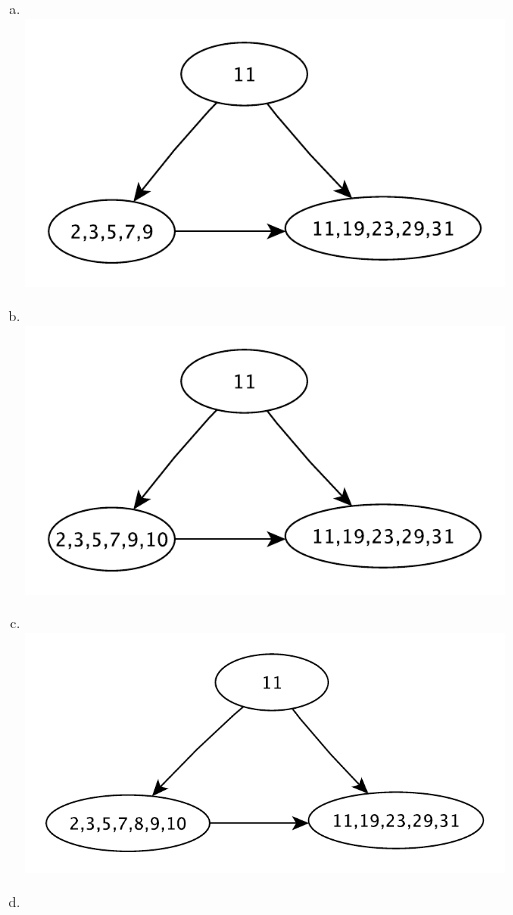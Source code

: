 \documentclass[a4paper,11pt]{article}
\begin{document}
\begin{enumerate}[a.]
    \item ~\\
        \includegraphics[scale=0.7]{2-3-1}
    \item ~\\
        \includegraphics[scale=0.7]{2-3-2}
    \item ~\\
        \includegraphics[scale=0.7]{2-3-3}
    \item ~\\

\end{enumerate}
\end{document}
